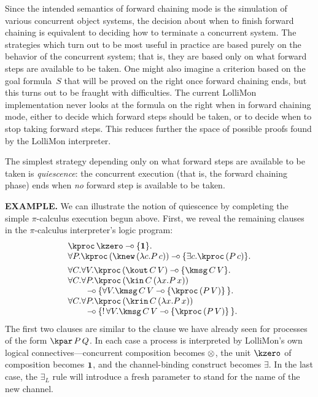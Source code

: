\documentclass{sig-alt}
\begin{document}
Since the intended semantics of forward chaining mode is the simulation
of various concurrent object systems, the decision about when to finish
forward chaining is equivalent to deciding how to terminate a concurrent
system.  The strategies which turn out to be most useful in practice are
based purely on the behavior of the concurrent system; that is, they are
based only on what forward steps are available to be taken.
One might also
imagine a criterion based on the goal formula~$S$ that will be proved on
the right once forward chaining ends, but this turns out to be fraught
with difficulties.  The current LolliMon implementation never
looks at the formula on the right when in forward chaining mode, either
to decide which forward steps should be taken, or to decide when to
stop taking forward steps.  This reduces further the space of possible
proofs found by the LolliMon interpreter.

The simplest strategy 
depending only on what
forward steps are available to be taken
is \emph{quiescence}: the concurrent execution (that is, the forward
chaining phase) ends when \emph{no} forward step is available to be
taken.

{\bf EXAMPLE.}\enspace
We can illustrate the notion of quiescence by completing the simple
$\pi$-calculus execution begun above. First, we reveal the remaining
clauses in the $\pi$-calculus interpreter's logic program:
$$
\begin{array}{l}
  \kproc\,\kzero \limp \{\one\}. \\
  \forall P.\kproc\,(\knew\,(\lambda c.P\,c)) \limp \{\exists c. \kproc\,(P\,c)\}. \\[1ex]
  \forall C.\forall V.\kproc\,(\kout\,C\,V) \limp \{\kmsg\,C\,V\}. \\
  \forall C.\forall P.\kproc\,(\kin\,C\,(\lambda x.P\,x)) \\
    \qquad{}\limp \{\forall V.\kmsg\,C\,V \limp \{\kproc\,(P\,V)\}\,\}. \\
  \forall C.\forall P.\kproc\,(\krin\,C\,(\lambda x.P\,x)) \\
    \qquad{}\limp \{\bang\forall V.\kmsg\,C\,V \limp \{\kproc\,(P\,V)\}\,\}. \\
\end{array}
$$
The first two clauses are similar to the clause we have already seen
for processes of the form $\kpar\,P\,Q$.  In each case a process is
interpreted by LolliMon's own logical connectives---concurrent composition
becomes $\otimes$, the unit $\kzero$ of composition becomes $\textbf{1}$, and
the channel-binding construct becomes $\exists$.  In the last case,
the $\exists_L$ rule will introduce a fresh parameter to stand
for the name of the new channel.
\end{document}
